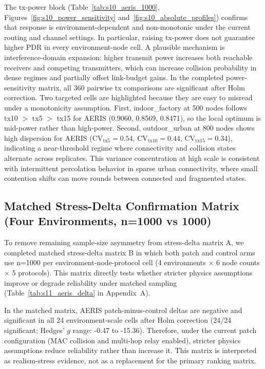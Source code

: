 ﻿\documentclass[sensors,article,submit,moreauthors,pdftex]{Definitions/mdpi}
\begin{document}
The tx-power block (Table~\ref{tab:s10_aeris_1000}, Figures~\ref{fig:s10_power_sensitivity} and~\ref{fig:s10_absolute_profiles}) confirms that response is environment-dependent and non-monotonic under the current routing and channel settings. In particular, raising tx-power does not guarantee higher PDR in every environment-node cell. A plausible mechanism is interference-domain expansion: higher transmit power increases both reachable receivers and competing transmitters, which can increase collision probability in dense regimes and partially offset link-budget gains. In the completed power-sensitivity matrix, all 360 pairwise tx comparisons are significant after Holm correction.
Two targeted cells are highlighted because they are easy to misread under a monotonicity assumption. First, indoor\_factory at 500 nodes follows tx10 $>$ tx5 $>$ tx15 for AERIS (0.9060, 0.8569, 0.8471), so the local optimum is mid-power rather than high-power. Second, outdoor\_urban at 800 nodes shows high dispersion for AERIS (CV$_{\text{tx5}}=0.54$, CV$_{\text{tx10}}=0.44$, CV$_{\text{tx15}}=0.34$), indicating a near-threshold regime where connectivity and collision states alternate across replicates. This variance concentration at high scale is consistent with intermittent percolation behavior in sparse urban connectivity, where small contention shifts can move rounds between connected and fragmented states.

\subsection{Matched Stress-Delta Confirmation Matrix (Four Environments, n=1000 vs 1000)}
To remove remaining sample-size asymmetry from stress-delta matrix A, we completed matched stress-delta matrix B in which both patch and control arms use n=1000 per environment-node-protocol cell (4 environments $\times$ 6 node counts $\times$ 5 protocols). This matrix directly tests whether stricter physics assumptions improve or degrade reliability under matched sampling (Table~\ref{tab:s11_aeris_delta} in Appendix~A).

In the matched matrix, AERIS patch-minus-control deltas are negative and significant in all 24 environment-scale cells after Holm correction (24/24 significant; Hedges' $g$ range: -0.47 to -15.36). Therefore, under the current patch configuration (MAC collision and multi-hop relay enabled), stricter physics assumptions reduce reliability rather than increase it. This matrix is interpreted as realism-stress evidence, not as a replacement for the primary ranking matrix.
\end{document}
